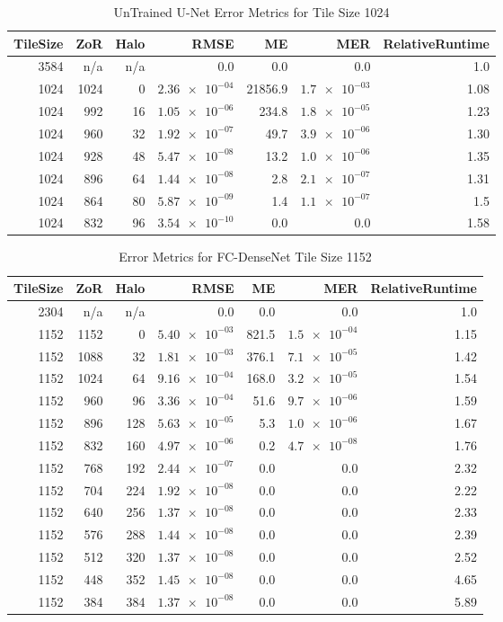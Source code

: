 \documentclass[10pt, indentfirst]{article}
\begin{document}
\begin{table}[h!]
	\centering
	\caption{UnTrained U-Net Error Metrics for Tile Size 1024}
	\label{tab:tile_size_1024}
	\begin{tabular}{r|r|r|r|r|r|r}
		TileSize & ZoR & Halo & RMSE    & ME & MER & RelativeRuntime \\ 
		\hline
		3584 & n/a & n/a & 0.0 & 0.0 & 0.0 & 1.0 \\
		1024 & 1024 & 0 & $\num{2.36e-04}$ & 21856.9 & $\num{1.7e-03}$ & 1.08 \\
		1024 & 992 & 16 & $\num{1.05e-06}$ & 234.8 & $\num{1.8e-05}$ & 1.23 \\
		1024 & 960 & 32 & $\num{1.92e-07}$ & 49.7 & $\num{3.9e-06}$ & 1.30 \\
		1024 & 928 & 48 & $\num{5.47e-08}$ & 13.2 & $\num{1.0e-06}$ & 1.35 \\
		1024 & 896 & 64 & $\num{1.44e-08}$ & 2.8 & $\num{2.1e-07}$ & 1.31 \\
		1024 & 864 & 80 & $\num{5.87e-09}$ & 1.4 & $\num{1.1e-07}$ & 1.5 \\
		1024 & 832 & 96 & $\num{3.54e-10}$ & 0.0 & 0.0 & 1.58 \\
	\end{tabular}
\end{table}


\begin{table}[h!]
	\centering
	\caption{Error Metrics for FC-DenseNet Tile Size 1152}
	\label{tab:tile_size_1152}
	\begin{tabular}{r|r|r|r|r|r|r}
		TileSize & ZoR & Halo & RMSE    & ME & MER & RelativeRuntime \\ 
		\hline
		2304 & n/a & n/a & 0.0 & 0.0 & 0.0 & 1.0 \\
		1152 & 1152 & 0 & $\num{5.40e-03}$ & 821.5 & $\num{1.5e-04}$ & 1.15 \\
		1152 & 1088 & 32 & $\num{1.81e-03}$ & 376.1 & $\num{7.1e-05}$ & 1.42 \\
		1152 & 1024 & 64 & $\num{9.16e-04}$ & 168.0 & $\num{3.2e-05}$ & 1.54 \\
		1152 & 960 & 96 & $\num{3.36e-04}$ & 51.6 & $\num{9.7e-06}$ & 1.59 \\
		1152 & 896 & 128 & $\num{5.63e-05}$ & 5.3 & $\num{1.0e-06}$ & 1.67 \\
		1152 & 832 & 160 & $\num{4.97e-06}$ & 0.2 & $\num{4.7e-08}$ & 1.76 \\
		1152 & 768 & 192 & $\num{2.44e-07}$ & 0.0 & 0.0 & 2.32 \\
		1152 & 704 & 224 & $\num{1.92e-08}$ & 0.0 & 0.0 & 2.22 \\
		1152 & 640 & 256 & $\num{1.37e-08}$ & 0.0 & 0.0 & 2.33 \\
		1152 & 576 & 288 & $\num{1.44e-08}$ & 0.0 & 0.0 & 2.39 \\
		1152 & 512 & 320 & $\num{1.37e-08}$ & 0.0 & 0.0 & 2.52 \\
		1152 & 448 & 352 & $\num{1.45e-08}$ & 0.0 & 0.0 & 4.65 \\
		1152 & 384 & 384 & $\num{1.37e-08}$ & 0.0 & 0.0 & 5.89 \\
	\end{tabular}
\end{table}
\end{document}
